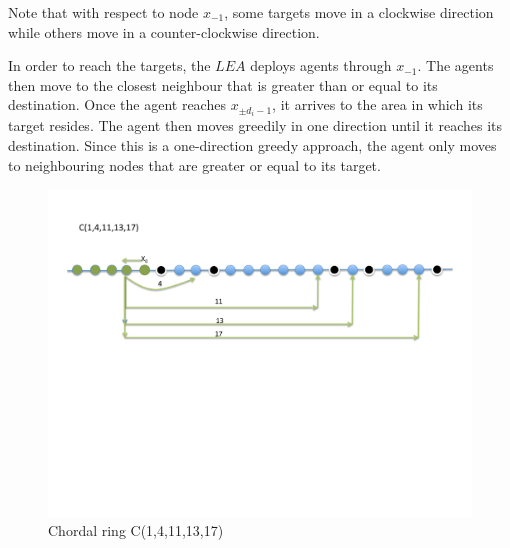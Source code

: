 Note that with respect to node $x_{-1}$, some targets move in a clockwise direction while others move in a counter-clockwise direction.

In order to reach the targets, the $LEA$ deploys agents through $x_{-1}$. The agents then move to the closest neighbour that is greater than or equal to its destination. Once the agent reaches $x_{\pm d_i-1}$, it arrives to the area in which its target resides. The agent then moves greedily in one direction until it reaches its destination. Since this is a one-direction greedy approach, the agent only moves to neighbouring nodes that are greater or equal  to its target. 




  \begin{figure}[h]
\centering
\includegraphics[scale=0.60]{example.pdf}
\caption{Chordal ring C(1,4,11,13,17)}
\label{fig:example}
\end{figure}


 







